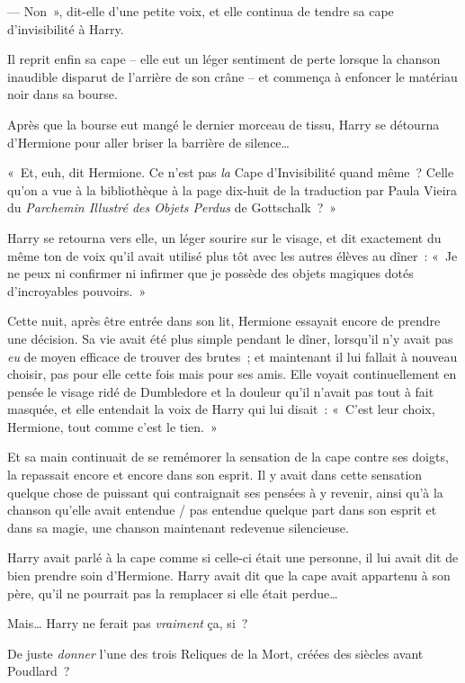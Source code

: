 --- Non~», dit-elle d'une petite voix, et elle continua de tendre sa cape d'invisibilité à Harry.

Il reprit enfin sa cape -- elle eut un léger sentiment de perte lorsque la chanson inaudible disparut de l'arrière de son crâne -- et commença à enfoncer le matériau noir dans sa bourse.

Après que la bourse eut mangé le dernier morceau de tissu, Harry se détourna d'Hermione pour aller briser la barrière de silence…

«~Et, euh, dit Hermione. Ce n'est pas \emph{la} Cape d'Invisibilité quand même~? Celle qu'on a vue à la bibliothèque à la page dix-huit de la traduction par Paula Vieira du \emph{Parchemin Illustré des Objets Perdus} de Gottschalk~?~»

Harry se retourna vers elle, un léger sourire sur le visage, et dit exactement du même ton de voix qu'il avait utilisé plus tôt avec les autres élèves au dîner~: «~Je ne peux ni confirmer ni infirmer que je possède des objets magiques dotés d'incroyables pouvoirs.~»

\later

Cette nuit, après être entrée dans son lit, Hermione essayait encore de prendre une décision. Sa vie avait été plus simple pendant le dîner, lorsqu'il n'y avait pas \emph{eu} de moyen efficace de trouver des brutes~; et maintenant il lui fallait à nouveau choisir, pas pour elle cette fois mais pour ses amis. Elle voyait continuellement en pensée le visage ridé de Dumbledore et la douleur qu'il n'avait pas tout à fait masquée, et elle entendait la voix de Harry qui lui disait~: «~C'est leur choix, Hermione, tout comme c'est le tien.~»

Et sa main continuait de se remémorer la sensation de la cape contre ses doigts, la repassait encore et encore dans son esprit. Il y avait dans cette sensation quelque chose de puissant qui contraignait ses pensées à y revenir, ainsi qu'à la chanson qu'elle avait entendue / pas entendue quelque part dans son esprit et dans sa magie, une chanson maintenant redevenue silencieuse.

Harry avait parlé à la cape comme si celle-ci était une personne, il lui avait dit de bien prendre soin d'Hermione. Harry avait dit que la cape avait appartenu à son père, qu'il ne pourrait pas la remplacer si elle était perdue…

Mais… Harry ne ferait pas \emph{vraiment} ça, si~?

De juste \emph{donner} l'une des trois Reliques de la Mort, créées des siècles avant Poudlard~?

